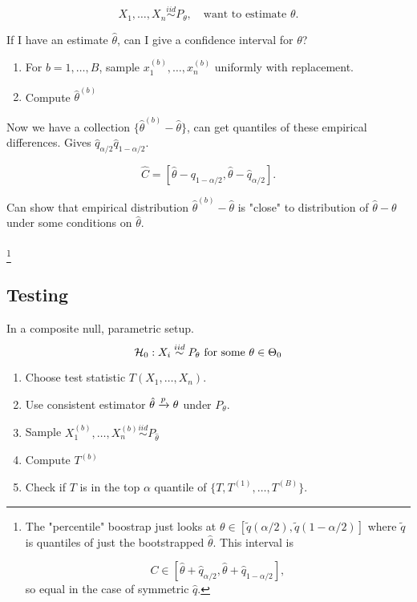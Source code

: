 \documentclass{article}
\newcommand{\simiid}{\overset{iid}\sim }
\begin{document}
$$X_1,\ldots, X_n \simiid P_\theta, \quad \text {want to estimate } \theta.$$

If I have an estimate $\hat \theta$, can I give a confidence interval for $\theta$? 

\begin{enumerate}
	\item For $b=1,\ldots, B$, sample $x_1^{(b)},\ldots, x_{n}^{(b)}$ uniformly with replacement.
	\item Compute $\hat \theta^{(b)}$ 
\end{enumerate}

Now we have a collection $\{\hat \theta^{(b)} - \hat \theta\}$, can get quantiles of these empirical differences. Gives $\hat q_{\alpha/2} \hat q_{1-\alpha/2}$. 

$$\hat C = [\hat \theta - q_{1-\alpha/2}, \hat \theta -\hat q_{\alpha/ 2}].$$

Can show that empirical distribution $\hat \theta ^{(b)}- \hat \theta$ is "close" to distribution of $\hat \theta - \theta$ under some conditions on $\hat \theta$. \\\\

\footnote{The "percentile" boostrap just looks at $\theta \in [\tilde q (\alpha/2), \tilde q(1-\alpha/2)]$ where $\tilde q$ is quantiles of just the bootstrapped $\hat \theta$. This interval is 

$$C\in [\hat \theta + \hat q_{\alpha/2}, \hat \theta + \hat q _{1-\alpha/2}],$$
so equal in the case of symmetric $\hat q$. }


\subsection{Testing}
In a composite null, parametric setup. 
$$\calH_0: X_i \simiid P_{\theta} \text{ for some } \theta\in \Theta_0$$

\begin{enumerate}
	\item Choose test statistic $T(X_1,\ldots, X_n)$. 
	\item Use consistent estimator $\hat \theta \xrightarrow{p} \theta$ under $P_\theta$. 
	\item Sample $X_1^{(b)}, \ldots, X_n^{(b)} \simiid P_{\hat \theta}$
	\item Compute $T^{(b)}$
	\item Check if $T$ is in the top $\alpha$ quantile of $\{T,T^{(1)},\ldots, T^{(B)}\}$. 
\end{enumerate}
\end{document}
